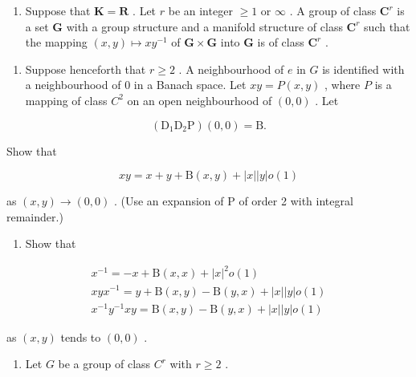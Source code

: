 
\begin{enumerate}
\def\labelenumi{\arabic{enumi}.}
\tightlist
\item
  Suppose that \(\mathbf{K} = \mathbf{R}\) . Let \(r\) be an integer \(\geqslant 1\) or \(\infty\) . A group of class \(\mathbf{C}^r\) is a set \(\mathbf{G}\) with a group structure and a manifold structure of class \(\mathbf{C}^r\) such that the mapping \((x,y)\mapsto xy^{-1}\) of \(\mathbf{G}\times \mathbf{G}\) into \(\mathbf{G}\) is of class \(\mathbf{C}^r\) .
\end{enumerate}

\begin{enumerate}
\def\labelenumi{(\alph{enumi})}
\tightlist
\item
  Suppose henceforth that \(r \geqslant 2\) . A neighbourhood of \(e\) in \(G\) is identified with a neighbourhood of 0 in a Banach space. Let \(xy = P(x, y)\) , where \(P\) is a mapping of class \(C^2\) on an open neighbourhood of \((0, 0)\) . Let
\end{enumerate}

\[
\left(\mathrm{D} _ {1} \mathrm{D} _ {2} \mathrm{P}\right) (0, 0) = \mathrm{B}.
\]

Show that

\[
x y = x + y + \mathrm{B} (x, y) + | x | | y | o (1)
\]

as \((x,y)\to (0,0)\) . (Use an expansion of P of order 2 with integral remainder.)

\begin{enumerate}
\def\labelenumi{(\alph{enumi})}
\setcounter{enumi}{1}
\tightlist
\item
  Show that
\end{enumerate}

\[
\begin{array}{c} x ^ {- 1} = - x + \mathrm{B} (x, x) + | x | ^ {2} o (1) \\ x y x ^ {- 1} = y + \mathrm{B} (x, y) - \mathrm{B} (y, x) + | x | | y | o (1) \\ x ^ {- 1} y ^ {- 1} x y = \mathrm{B} (x, y) - \mathrm{B} (y, x) + | x | | y | o (1) \end{array}
\]

as \((x,y)\) tends to \((0,0)\) .

\begin{enumerate}
\def\labelenumi{\arabic{enumi}.}
\setcounter{enumi}{1}
\tightlist
\item
  Let \(G\) be a group of class \(C^r\) with \(r \geqslant 2\) .
\end{enumerate}

